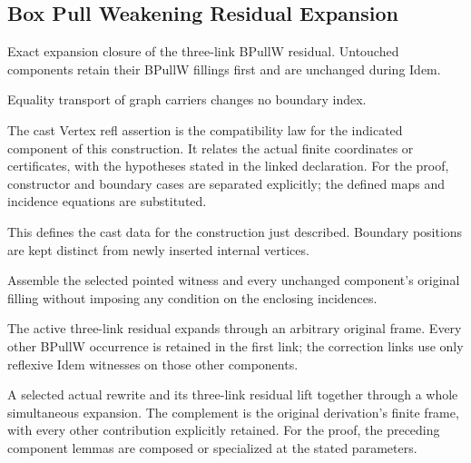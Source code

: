 \subsection{Box Pull Weakening Residual Expansion}
Exact expansion closure of the three-link BPullW residual. Untouched components retain their BPullW fillings first and are unchanged during Idem.

Equality transport of graph carriers changes no boundary index.
\par{}

The cast Vertex refl assertion is the compatibility law for the indicated component of this construction. It relates the actual finite coordinates or certificates, with the hypotheses stated in the linked declaration.
For the proof, constructor and boundary cases are separated explicitly; the defined maps and incidence equations are substituted.
\par{}

This defines the cast data for the construction just described. Boundary positions are kept distinct from newly inserted internal vertices.
\par{}

Assemble the selected pointed witness and every unchanged component's original filling without imposing any condition on the enclosing incidences.
\par{}

The active three-link residual expands through an arbitrary original frame. Every other BPullW occurrence is retained in the first link; the correction links use only reflexive Idem witnesses on those other components.
\par{}

A selected actual rewrite and its three-link residual lift together through a whole simultaneous expansion. The complement is the original derivation's finite frame, with every other contribution explicitly retained.
For the proof, the preceding component lemmas are composed or specialized at the stated parameters.
\par{}

